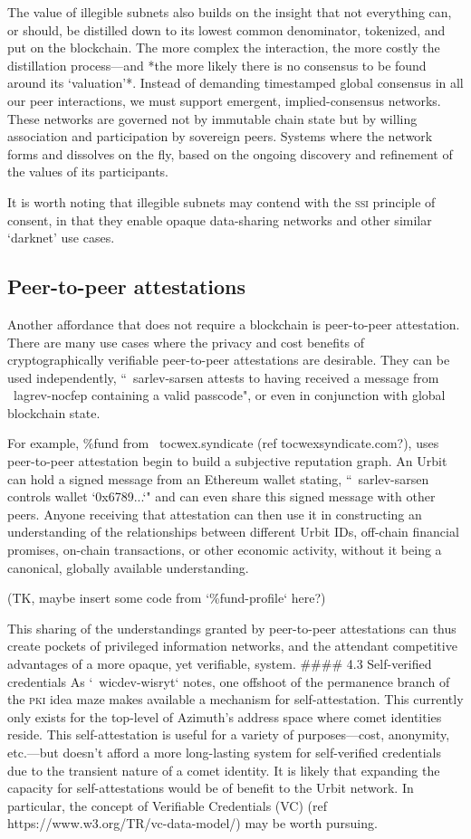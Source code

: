 \documentclass[twoside]{article}
\begin{document}
The value of illegible subnets also builds on the insight that not everything can, or should, be distilled down to its lowest common denominator, tokenized, and put on the blockchain. The more complex the interaction, the more costly the distillation process—and *the more likely there is no consensus to be found around its `valuation'*. Instead of demanding timestamped global consensus in all our peer interactions, we must support emergent, implied-consensus networks. These networks are governed not by immutable chain state but by willing association and participation by sovereign peers. Systems where the network forms and dissolves on the fly, based on the ongoing discovery and refinement of the values of its participants. 

It is worth noting that illegible subnets may contend with the \textsc{ssi} principle of consent, in that they enable opaque data-sharing networks and other similar `darknet' use cases.

\subsection{Peer-to-peer attestations}

Another affordance that does not require a blockchain is peer-to-peer attestation. There are many use cases where the privacy and cost benefits of cryptographically verifiable peer-to-peer attestations are desirable. They can be used independently, ``~sarlev-sarsen attests to having received a message from ~lagrev-nocfep containing a valid passcode", or even in conjunction with global blockchain state.

For example, \%fund from ~tocwex.syndicate (ref tocwexsyndicate.com?), uses peer-to-peer attestation begin to build a subjective reputation graph. An Urbit can hold a signed message from an Ethereum wallet stating, ``~sarlev-sarsen controls wallet `0x6789...`" and can even share this signed message with other peers. Anyone receiving that attestation can then use it in constructing an understanding of the relationships between different Urbit IDs, off-chain financial promises, on-chain transactions, or other economic activity, without it being a canonical, globally available understanding.

(TK, maybe insert some code from `\%fund-profile` here?)

This sharing of the understandings granted by peer-to-peer attestations can thus create pockets of privileged information networks, and the attendant competitive advantages of a more opaque, yet verifiable, system.
#### 4.3 Self-verified credentials
As `~wicdev-wisryt` notes, one offshoot of the permanence branch of the \textsc{pki} idea maze makes available a mechanism for self-attestation. This currently only exists for the top-level of Azimuth's address space where comet identities reside. This self-attestation is useful for a variety of purposes—cost, anonymity, etc.—but doesn't afford a more long-lasting system for self-verified credentials due to the transient nature of a comet identity. It is likely that expanding the capacity for self-attestations would be of benefit to the Urbit network. In particular, the concept of Verifiable Credentials (VC) (ref https://www.w3.org/TR/vc-data-model/) may be worth pursuing.
\end{document}
